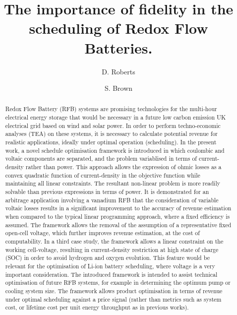 \documentclass[preprint,3p,review,authoryear,10pt]{elsarticle}
\begin{document}
\linenumbers
\begin{frontmatter}

\title{The importance of fidelity in the scheduling of Redox Flow Batteries.}


\author{D. Roberts }
\author[]{S. Brown }

\address{Department of Chemical and Biological Engineering, The University of Sheffield, Sheffield S10 2TN}



\begin{abstract}
Redox Flow Battery (RFB) systems are promising technologies for the multi-hour electrical energy storage that would be necessary in a future low carbon emission UK electrical grid based on wind and solar power. In order to perform techno-economic analyses (TEA) on these systems, it is necessary to calculate potential revenue for realistic applications, ideally under optimal operation (scheduling). In the present work, a novel schedule optimisation framework is introduced in which coulombic and voltaic components are separated, and the problem variablised in terms of current-density rather than power. This approach allows the expression of ohmic losses as a convex quadratic function of current-density in the objective function while maintaining all linear constraints. The resultant non-linear problem is more readily solvable than previous expressions in terms of power. It is demonstrated for an arbitrage application involving a vanadium RFB that the consideration of variable voltaic losses results in a significant improvement to the accuracy of revenue estimation when compared to the typical linear programming approach, where a fixed efficiency is assumed. The framework allows the removal of the assumption of a representative fixed open-cell voltage, which further improves revenue estimation, at the cost of computability. In a third case study, the framework allows a linear constraint on the working cell-voltage, resulting in current-density restriction at high state of charge (SOC) in order to avoid hydrogen and oxygen evolution. This feature would be relevant for the optimisation of Li-ion battery scheduling, where voltage is a very important consideration. The introduced framework is intended to assist technical optimisation of future RFB systems, for example in determining the optimum pump or cooling system size. The framework allows product optimisation in terms of revenue under optimal scheduling against a price signal (rather than metrics such as system cost, or lifetime cost per unit energy throughput as in previous works).


\end{abstract}
\end{frontmatter}
\end{document}
